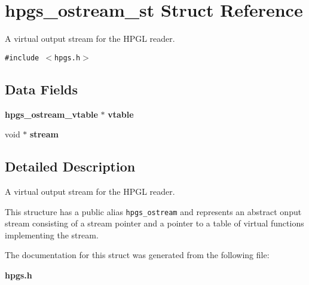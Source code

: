 \section{hpgs\_\-ostream\_\-st Struct Reference}
\label{structhpgs__ostream__st}
A virtual output stream for the HPGL reader.  


{\tt \#include $<$hpgs.h$>$}

\subsection*{Data Fields}
\begin{CompactItemize}
\item 
{\bf hpgs\_\-ostream\_\-vtable} $\ast$ \textbf{vtable}\label{structhpgs__ostream__st_b483e6635fb331ce2daa35976b895e66}

\item 
void $\ast$ \textbf{stream}\label{structhpgs__ostream__st_dec8c7e73498abdcf10bc25c0dc94383}

\end{CompactItemize}


\subsection{Detailed Description}
A virtual output stream for the HPGL reader. 

This structure has a public alias {\tt hpgs\_\-ostream} and represents an abstract onput stream consisting of a stream pointer and a pointer to a table of virtual functions implementing the stream. 

The documentation for this struct was generated from the following file:\begin{CompactItemize}
\item 
{\bf hpgs.h}\end{CompactItemize}
